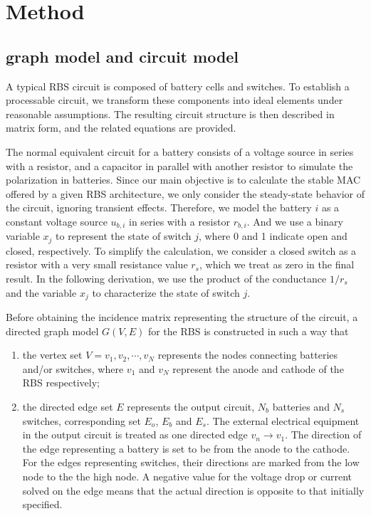 \documentclass{article}
\begin{document}
\section{Method}

\subsection{graph model and circuit model}

A typical RBS circuit is composed of battery cells and switches. 
To establish a processable circuit, we transform these components into ideal elements under reasonable assumptions. 
The resulting circuit structure is then described in matrix form, and the related equations are provided.


The normal equivalent circuit for a battery consists of a voltage source in series with a resistor, and a capacitor in parallel with another resistor to simulate the polarization in batteries. 
Since our main objective is to calculate the stable MAC offered by a given RBS architecture, we only consider the steady-state behavior of the circuit, ignoring transient effects. 
Therefore, we model the battery $i$ as a constant voltage source $u_{b,i}$ in series with a resistor $r_{b,i}$. 
And we use a binary variable $x_j$ to represent the state of switch $j$, where 0 and 1 indicate open and closed, respectively. 
To simplify the calculation, we consider a closed switch as a resistor with a very small resistance value $r_s$, which we treat as zero in the final result. 
In the following derivation, we use the product of the conductance $1/r_s$ and the variable $x_j$ to characterize the state of switch $j$.


Before obtaining the incidence matrix representing the structure of the circuit, a directed graph model $G(V,E)$ for the RBS is constructed in such a way that
\begin{enumerate}[(1)]
    \item the vertex set $V={v_1,v_2,\cdots,v_N}$ represents the nodes connecting batteries and/or switches, where $v_1$ and $v_N$ represent the anode and cathode of the RBS respectively;
    \item the directed edge set $E$ represents the output circuit, $N_b$ batteries and $N_s$ switches, corresponding set $E_o$, $E_b$ and $E_s$. The external electrical equipment in the output circuit is treated as one directed edge $v_n \to v_1$. The direction of the edge representing a battery is set to be from the anode to the cathode. For the edges representing switches, their directions are marked from the low node to the the high node. A negative value for the voltage drop or current solved on the edge means that the actual direction is opposite to that initially specified.
\end{enumerate}
\end{document}
